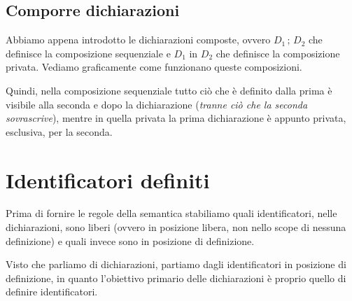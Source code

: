 \documentclass[oneside,a4paper,11pt]{book}
\theoremstyle{italicstyle}
\theoremstyle{normStyle}
\begin{document}
\subsection{Comporre dichiarazioni}
Abbiamo appena introdotto le dichiarazioni composte,
ovvero $D_1\,;\,D_2$ che definisce la composizione sequenziale e
$D_1$ in $D_2$ che definisce la composizione privata. Vediamo
graficamente come funzionano queste composizioni.
\begin{figure}[H]
  \centering
\end{figure}
Quindi, nella composizione sequenziale tutto ciò che è definito dalla 
prima è visibile alla seconda e dopo la dichiarazione
(\textit{tranne ciò che la seconda sovrascrive}), mentre in quella privata la
prima dichiarazione è appunto privata, esclusiva, per la seconda.
\begin{figure}[H]
  \centering
\end{figure}
\section{Identificatori definiti}
Prima di fornire le regole della semantica stabiliamo quali identificatori, nelle dichiarazioni,
sono liberi (ovvero in posizione libera, non nello scope di nessuna definizione) e
quali invece sono in posizione di definizione.

Visto che parliamo di dichiarazioni, partiamo dagli identificatori
in posizione di definizione, in quanto l’obiettivo primario delle
dichiarazioni è proprio quello di definire identificatori.
\end{document}
